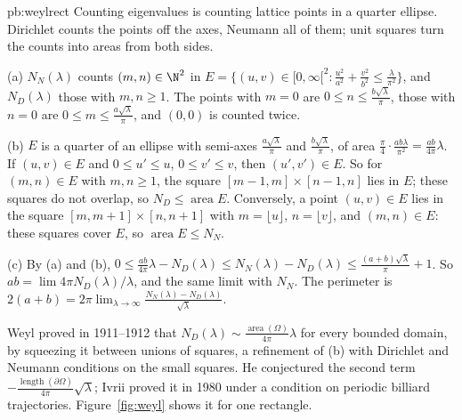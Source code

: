 \begin{solution}{pb:weylrect}
\idea Counting eigenvalues is counting lattice points in a quarter ellipse. Dirichlet counts the points off the axes, Neumann all of them; unit squares turn the counts into areas from both sides.

\writeup (a) $N_N(\lambda)$ counts $(m,n)\in\N^2$ in $E=\{(u,v)\in[0,\infty[^2:\frac{u^2}{a^2}+\frac{v^2}{b^2}\le\frac\lambda{\pi^2}\}$, and $N_D(\lambda)$ those with $m,n\ge1$. The points with $m=0$ are
$0\le n\le\frac{b\sqrt\lambda}\pi$, those with $n=0$ are $0\le m\le\frac{a\sqrt\lambda}\pi$, and $(0,0)$ is counted twice.

(b) $E$ is a quarter of an ellipse with semi-axes $\frac{a\sqrt\lambda}\pi$ and $\frac{b\sqrt\lambda}\pi$, of area $\frac\pi4\cdot\frac{ab\lambda}{\pi^2}=\frac{ab}{4\pi}\lambda$. If $(u,v)\in E$ and
$0\le u'\le u$, $0\le v'\le v$, then $(u',v')\in E$. So for $(m,n)\in E$ with $m,n\ge1$, the square $[m-1,m]\times[n-1,n]$ lies in $E$; these squares do not overlap, so $N_D\le\operatorname{area}E$.
Conversely, a point $(u,v)\in E$ lies in the square $[m,m+1]\times[n,n+1]$ with $m=\lfloor u\rfloor$, $n=\lfloor v\rfloor$, and $(m,n)\in E$: these squares cover $E$, so
$\operatorname{area}E\le N_N$.

(c) By (a) and (b), $0\le\frac{ab}{4\pi}\lambda-N_D(\lambda)\le N_N(\lambda)-N_D(\lambda)\le\frac{(a+b)\sqrt\lambda}\pi+1$. So $ab=\lim4\pi N_D(\lambda)/\lambda$, and the same limit with $N_N$. The perimeter is
$2(a+b)=2\pi\lim_{\lambda\to\infty}\frac{N_N(\lambda)-N_D(\lambda)}{\sqrt\lambda}$.

\leads Weyl proved in 1911--1912 that $N_D(\lambda)\sim\frac{\operatorname{area}(\Omega)}{4\pi}\lambda$ for every bounded domain, by squeezing it between unions of squares, a refinement of (b) with
Dirichlet and Neumann conditions on the small squares. He conjectured the second term $-\frac{\operatorname{length}(\partial\Omega)}{4\pi}\sqrt\lambda$; Ivrii proved it in 1980 under a condition
on periodic billiard trajectories. Figure~\ref{fig:weyl} shows it for one rectangle.
\end{solution}

